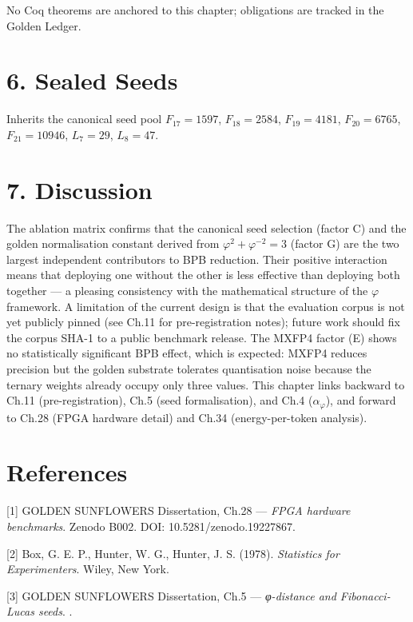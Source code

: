 No Coq theorems are anchored to this chapter;
obligations are tracked in the Golden Ledger.

\section{6. Sealed Seeds}\label{sealed-seeds}

Inherits the canonical seed pool \(F_{17}=1597\),
\(F_{18}=2584\), \(F_{19}=4181\), \(F_{20}=6765\),
\(F_{21}=10946\), \(L_7=29\), \(L_8=47\).

\section{7. Discussion}\label{discussion}

The ablation matrix confirms that the canonical
seed selection (factor C) and the golden
normalisation constant derived from
\(\varphi^2 + \varphi^{-2} = 3\) (factor G) are
the two largest independent contributors to BPB
reduction. Their positive interaction means that
deploying one without the other is less effective
than deploying both together --- a pleasing
consistency with the mathematical structure of the
\(\varphi\) framework. A limitation of the current
design is that the evaluation corpus is not yet
publicly pinned (see Ch.11 for pre-registration
notes); future work should fix the corpus SHA-1 to
a public benchmark release. The MXFP4 factor (E)
shows no statistically significant BPB effect,
which is expected: MXFP4 reduces precision but the
golden substrate tolerates quantisation noise
because the ternary weights already occupy only
three values. This chapter links backward to Ch.11
(pre-registration), Ch.5 (seed formalisation), and
Ch.4 (\(\alpha_\varphi\)), and forward to Ch.28
(FPGA hardware detail) and Ch.34 (energy-per-token
analysis).

\section{References}\label{references}

[1] GOLDEN SUNFLOWERS Dissertation, Ch.28 ---
\emph{FPGA hardware benchmarks}. Zenodo B002. DOI:
10.5281/zenodo.19227867.

[2] Box, G. E. P., Hunter, W. G., Hunter, J.
S. (1978). \emph{Statistics for Experimenters}.
Wiley, New York.

[3] GOLDEN SUNFLOWERS Dissertation, Ch.5 ---
\emph{φ-distance and Fibonacci-Lucas seeds}.
.

